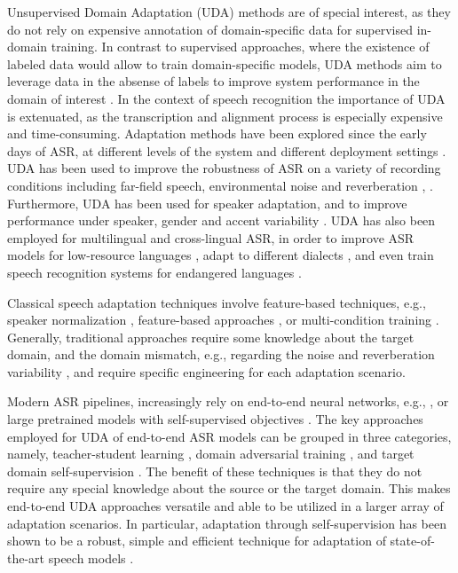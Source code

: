 \documentclass[journal]{IEEEtran}
\begin{document}
Unsupervised Domain Adaptation (UDA) methods are of special interest, as they do not rely on expensive annotation of domain-specific data for supervised in-domain training.
In contrast to supervised approaches, where the existence of labeled  data would allow to train domain-specific models, UDA methods aim to leverage data in the absense of labels to improve system performance in the domain of interest \cite{long2015learning,ganin2016domain}.
In the context of speech recognition the importance of UDA is extenuated, as the transcription and alignment process is especially expensive and time-consuming.
Adaptation methods have been explored since the early days of ASR, at different levels of the system and  different deployment settings \cite{bell2020adaptation}.
UDA has been used  to improve the robustness of ASR on a variety of recording conditions including far-field speech, environmental noise and reverberation \cite{selftrainASRSoftFirst,selftrainSoftpovey}, \cite{adverserialASR1}. Furthermore, UDA has been used for speaker adaptation, and to improve performance under speaker, gender and accent variability \cite{adverserialASRspeaker,adverserialASRaccent}.
UDA has also been employed for multilingual and cross-lingual ASR, in order to improve ASR models for low-resource languages \cite{adverserialASRlow}, adapt to different dialects \cite{asami2017domain}, and even train speech recognition systems for endangered languages \cite{NOWAKOWSKI2023103149}.


Classical speech adaptation techniques involve feature-based techniques, e.g.,
speaker normalization \cite{furui1980training}, feature-based approaches \cite{miao2014towards,parthasarathi2015fmllr,ivectors}, or multi-condition training \cite{hirsch2000aurora}.
Generally, traditional approaches require some knowledge about the target domain, and the domain mismatch, e.g., regarding the noise and reverberation variability \cite{7472774}, and require specific engineering for each adaptation scenario.


Modern ASR pipelines, increasingly rely on end-to-end neural networks, e.g., \cite{las,rnnt}, or large pretrained models with self-supervised objectives \cite{baevski2020wav2vec,conneau21_interspeech}. The key approaches employed for UDA of end-to-end ASR models can be grouped
in three categories, namely, teacher-student learning \cite{asami2017domain}, domain adversarial training
 \cite{denisov2018unsupervised}, and target domain self-supervision  \cite{google21domain}. The benefit of these techniques is that they do not require any special knowledge about the source or the target domain. This makes end-to-end UDA approaches versatile and able to be utilized in a larger array of adaptation scenarios. In particular, adaptation through self-supervision has been shown to be a robust, simple and efficient technique for adaptation of state-of-the-art speech models \cite{hsu21_interspeech}.
\end{document}
